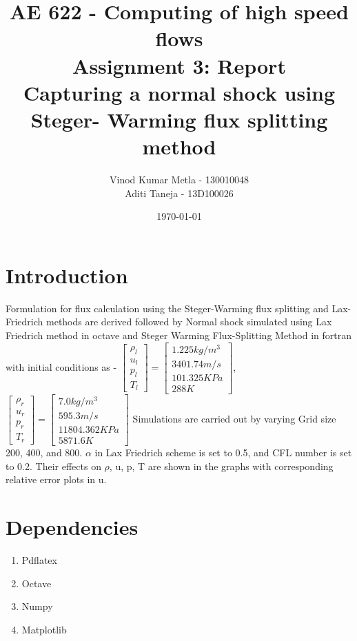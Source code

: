 \documentclass{article}
\title{AE 622 -  Computing of high speed flows\\ Assignment 3: Report \\ Capturing a normal shock using Steger- Warming flux splitting method}
\author{Vinod Kumar Metla - 130010048\\Aditi Taneja - 13D100026}
\date{\today}
\begin{document}
\maketitle
\newpage
\section*{Introduction}
Formulation for flux calculation using the Steger-Warming flux splitting and Lax-Friedrich methods are derived followed by Normal shock simulated using Lax Friedrich method in octave and Steger Warming Flux-Splitting Method in fortran with initial conditions as - 
\newline
    $\begin{bmatrix}
    \rho_l \\ 
    u_l \\
    p_l \\
    T_l
    \end{bmatrix} = \begin{bmatrix}
    1.225 kg/m^3\\ 
    3401.74 m/s\\
    101.325 KPa\\
    288 K
    \end{bmatrix} $, 
\\
$\begin{bmatrix}
    \rho_r \\ 
    u_r \\
    p_r \\
    T_r
    \end{bmatrix} = \begin{bmatrix}
    7.0 kg/m^3\\ 
    595.3 m/s \\
    11804.362 KPa \\
    5871.6 K
    \end{bmatrix} $
\newline
Simulations are carried out by varying Grid size 200, 400, and 800. $\alpha$ in Lax Friedrich scheme is set to 0.5, and CFL number is set to 0.2. Their effects on $\rho$, u, p, T are shown in the graphs with corresponding relative error plots in u.

\section*{Dependencies}
\begin{enumerate}
\item Pdflatex 
\item Octave
\item Numpy
\item Matplotlib

\end{enumerate}
\newpage
\end{document}
